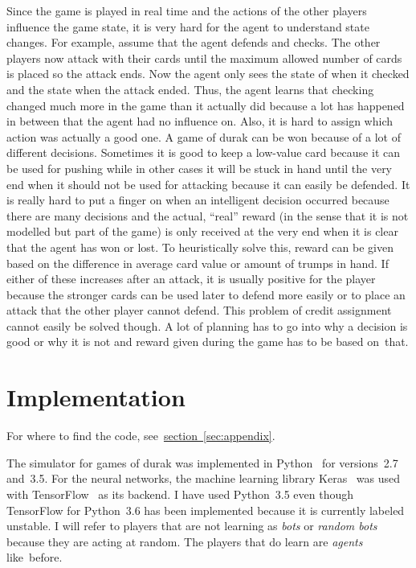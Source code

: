 \documentclass[a4paper,titlepage]{article}
\begin{document}
Since the game is played in real time and the actions of the other players influence the game state, it is very hard for the agent to understand state changes. For example, assume that the agent defends and checks. The other players now attack with their cards until the maximum allowed number of cards is placed so the attack ends. Now the agent only sees the state of when it checked and the state when the attack ended. Thus, the agent learns that checking changed much more in the game than it actually did because a lot has happened in between that the agent had no influence on. Also, it is hard to assign which action was actually a good one. A game of durak can be won because of a lot of different decisions. Sometimes it is good to keep a low-value card because it can be used for pushing while in other cases it will be stuck in hand until the very end when it should not be used for attacking because it can easily be defended. It is really hard to put a finger on when an intelligent decision occurred because there are many decisions and the actual, ``real'' reward (in the sense that it is not modelled but part of the game) is only received at the very end when it is clear that the agent has won or lost. To heuristically solve this, reward can be given based on the difference in average card value or amount of trumps in hand. If either of these increases after an attack, it is usually positive for the player because the stronger cards can be used later to defend more easily or to place an attack that the other player cannot defend. This problem of credit assignment cannot easily be solved though. A lot of planning has to go into why a decision is good or why it is not and reward given during the game has to be based on~that.

\newpage

\section{Implementation}
\label{sec:implementation}

For where to find the code, see~\hyperref[sec:appendix]{section~\ref*{sec:appendix}}.

The simulator for games of durak was implemented in Python~\cite{python} for versions~2.7 and~3.5. For the neural networks, the machine learning library Keras~\cite{keras} was used with {TensorFlow}~\cite{tensorflow}  as its backend. I have used Python~3.5 even though TensorFlow for Python~3.6 has been implemented because it is currently labeled unstable. I will refer to players that are not learning as \emph{bots} or \emph{random bots} because they are acting at random. The players that do learn are \emph{agents} like~before.
\end{document}
